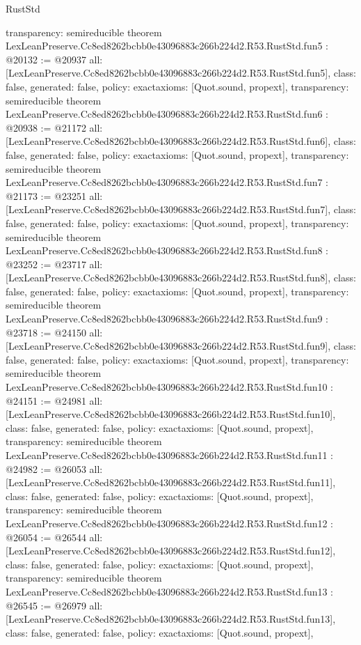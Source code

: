 \begin{lexlean}{RustStd}
\begin{coremodule}
{  transparency: semireducible
}
theorem LexLeanPreserve.Cc8ed8262bcbb0e43096883c266b224d2.R53.RustStd.fun5 : @20132 := @20937 {
  all: [LexLeanPreserve.Cc8ed8262bcbb0e43096883c266b224d2.R53.RustStd.fun5],
  class: false,
  generated: false,
  policy: exact{axioms: [Quot.sound, propext]},
  transparency: semireducible
}
theorem LexLeanPreserve.Cc8ed8262bcbb0e43096883c266b224d2.R53.RustStd.fun6 : @20938 := @21172 {
  all: [LexLeanPreserve.Cc8ed8262bcbb0e43096883c266b224d2.R53.RustStd.fun6],
  class: false,
  generated: false,
  policy: exact{axioms: [Quot.sound, propext]},
  transparency: semireducible
}
theorem LexLeanPreserve.Cc8ed8262bcbb0e43096883c266b224d2.R53.RustStd.fun7 : @21173 := @23251 {
  all: [LexLeanPreserve.Cc8ed8262bcbb0e43096883c266b224d2.R53.RustStd.fun7],
  class: false,
  generated: false,
  policy: exact{axioms: [Quot.sound, propext]},
  transparency: semireducible
}
theorem LexLeanPreserve.Cc8ed8262bcbb0e43096883c266b224d2.R53.RustStd.fun8 : @23252 := @23717 {
  all: [LexLeanPreserve.Cc8ed8262bcbb0e43096883c266b224d2.R53.RustStd.fun8],
  class: false,
  generated: false,
  policy: exact{axioms: [Quot.sound, propext]},
  transparency: semireducible
}
theorem LexLeanPreserve.Cc8ed8262bcbb0e43096883c266b224d2.R53.RustStd.fun9 : @23718 := @24150 {
  all: [LexLeanPreserve.Cc8ed8262bcbb0e43096883c266b224d2.R53.RustStd.fun9],
  class: false,
  generated: false,
  policy: exact{axioms: [Quot.sound, propext]},
  transparency: semireducible
}
theorem LexLeanPreserve.Cc8ed8262bcbb0e43096883c266b224d2.R53.RustStd.fun10 : @24151 := @24981 {
  all: [LexLeanPreserve.Cc8ed8262bcbb0e43096883c266b224d2.R53.RustStd.fun10],
  class: false,
  generated: false,
  policy: exact{axioms: [Quot.sound, propext]},
  transparency: semireducible
}
theorem LexLeanPreserve.Cc8ed8262bcbb0e43096883c266b224d2.R53.RustStd.fun11 : @24982 := @26053 {
  all: [LexLeanPreserve.Cc8ed8262bcbb0e43096883c266b224d2.R53.RustStd.fun11],
  class: false,
  generated: false,
  policy: exact{axioms: [Quot.sound, propext]},
  transparency: semireducible
}
theorem LexLeanPreserve.Cc8ed8262bcbb0e43096883c266b224d2.R53.RustStd.fun12 : @26054 := @26544 {
  all: [LexLeanPreserve.Cc8ed8262bcbb0e43096883c266b224d2.R53.RustStd.fun12],
  class: false,
  generated: false,
  policy: exact{axioms: [Quot.sound, propext]},
  transparency: semireducible
}
theorem LexLeanPreserve.Cc8ed8262bcbb0e43096883c266b224d2.R53.RustStd.fun13 : @26545 := @26979 {
  all: [LexLeanPreserve.Cc8ed8262bcbb0e43096883c266b224d2.R53.RustStd.fun13],
  class: false,
  generated: false,
  policy: exact{axioms: [Quot.sound, propext]},
}
\end{coremodule}
\end{lexlean}
